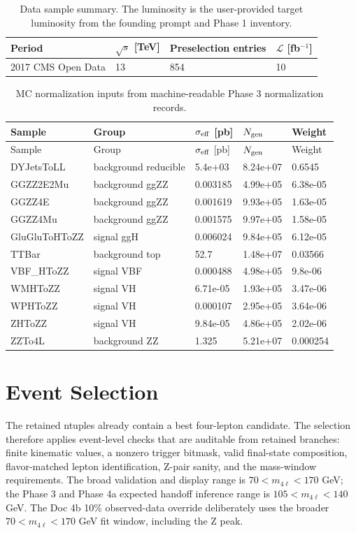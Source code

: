 \documentclass[11pt]{article}
\begin{document}
\begin{table}[htbp]
\centering
\caption{Data sample summary. The luminosity is the user-provided target luminosity from the founding prompt and Phase 1 inventory.}
\begin{tabular}{llll}
\toprule
Period & $\sqrt{s}$ [TeV] & Preselection entries & $\mathcal{L}$ [fb$^{-1}$] \\ 
\midrule
2017 CMS Open Data & 13 & 854 & 10 \\ 
\bottomrule
\end{tabular}
\label{tab:data-summary}
\end{table}

\begin{longtable}{lllll}
\caption{MC normalization inputs from machine-readable Phase 3 normalization records.}\label{tab:mc-samples}\\
\toprule
Sample & Group & $\sigma_{\rm eff}$ [pb] & $N_{\rm gen}$ & Weight \\ 
\midrule
\endfirsthead
\toprule
Sample & Group & $\sigma_{\rm eff}$ [pb] & $N_{\rm gen}$ & Weight \\ 
\midrule
\endhead
DYJetsToLL & background reducible & 5.4e+03 & 8.24e+07 & 0.6545 \\
GGZZ2E2Mu & background ggZZ & 0.003185 & 4.99e+05 & 6.38e-05 \\
GGZZ4E & background ggZZ & 0.001619 & 9.93e+05 & 1.63e-05 \\
GGZZ4Mu & background ggZZ & 0.001575 & 9.97e+05 & 1.58e-05 \\
GluGluToHToZZ & signal ggH & 0.006024 & 9.84e+05 & 6.12e-05 \\
TTBar & background top & 52.7 & 1.48e+07 & 0.03566 \\
VBF\_HToZZ & signal VBF & 0.000488 & 4.98e+05 & 9.8e-06 \\
WMHToZZ & signal VH & 6.71e-05 & 1.93e+05 & 3.47e-06 \\
WPHToZZ & signal VH & 0.000107 & 2.95e+05 & 3.64e-06 \\
ZHToZZ & signal VH & 9.84e-05 & 4.86e+05 & 2.02e-06 \\
ZZTo4L & background ZZ & 1.325 & 5.21e+07 & 0.000254 \\
\bottomrule
\end{longtable}


\section{Event Selection}
The retained ntuples already contain a best four-lepton candidate. The selection therefore applies event-level checks that are auditable from retained branches: finite kinematic values, a nonzero trigger bitmask, valid final-state composition, flavor-matched lepton identification, Z-pair sanity, and the mass-window requirements. The broad validation and display range is $70<m_{4\ell}<170$ GeV; the Phase 3 and Phase 4a expected handoff inference range is $105<m_{4\ell}<140$ GeV. The Doc 4b 10\% observed-data override deliberately uses the broader $70<m_{4\ell}<170$ GeV fit window, including the Z peak.
\end{document}

